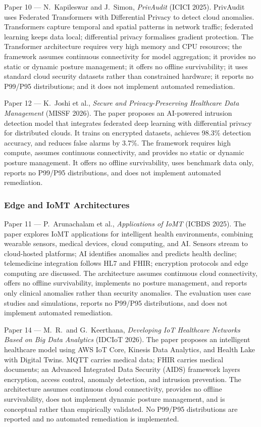 {Paper 10 --- N.~Kapileswar and J.~Simon, \textit{PrivAudit} (ICICI 2025).} PrivAudit uses Federated Transformers with Differential Privacy to detect cloud anomalies. Transformers capture temporal and spatial patterns in network traffic; federated learning keeps data local; differential privacy formalises gradient protection. The Transformer architecture requires very high memory and CPU resources; the framework assumes continuous connectivity for model aggregation; it provides no static or dynamic posture management; it offers no offline survivability; it uses standard cloud security datasets rather than constrained hardware; it reports no P99/P95 distributions; and it does not implement automated remediation.

{Paper 12 --- K.~Joshi et al., \textit{Secure and Privacy-Preserving Healthcare Data Management} (MISSF 2026).} The paper proposes an AI-powered intrusion detection model that integrates federated deep learning with differential privacy for distributed clouds. It trains on encrypted datasets, achieves 98.3\% detection accuracy, and reduces false alarms by 3.7\%. The framework requires high compute, assumes continuous connectivity, and provides no static or dynamic posture management. It offers no offline survivability, uses benchmark data only, reports no P99/P95 distributions, and does not implement automated remediation.

\subsubsection{Edge and IoMT Architectures}

{Paper 11 --- P.~Arunachalam et al., \textit{Applications of IoMT} (ICBDS 2025).} The paper explores IoMT applications for intelligent health environments, combining wearable sensors, medical devices, cloud computing, and AI. Sensors stream to cloud-hosted platforms; AI identifies anomalies and predicts health decline; telemedicine integration follows HL7 and FHIR; encryption protocols and edge computing are discussed. The architecture assumes continuous cloud connectivity, offers no offline survivability, implements no posture management, and reports only clinical anomalies rather than security anomalies. The evaluation uses case studies and simulations, reports no P99/P95 distributions, and does not implement automated remediation.

{Paper 14 --- M.~R.~and G.~Keerthana, \textit{Developing IoT Healthcare Networks Based on Big Data Analytics} (IDCIoT 2026).} The paper proposes an intelligent healthcare model using AWS IoT Core, Kinesis Data Analytics, and Health Lake with Digital Twins. MQTT carries medical data; FHIR carries medical documents; an Advanced Integrated Data Security (AIDS) framework layers encryption, access control, anomaly detection, and intrusion prevention. The architecture assumes continuous cloud connectivity, provides no offline survivability, does not implement dynamic posture management, and is conceptual rather than empirically validated. No P99/P95 distributions are reported and no automated remediation is implemented.

